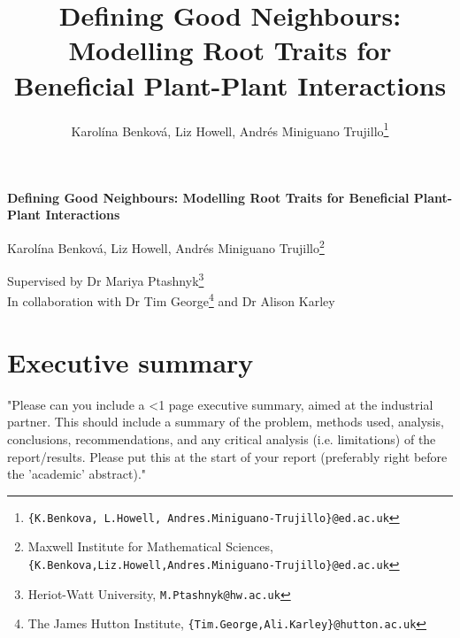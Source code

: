 \documentclass[11pt]{article}
\title{\bf
    \Large
    Defining Good Neighbours: Modelling Root Traits for Beneficial Plant-Plant Interactions
}
\author{
    Karolína Benková, Liz Howell, Andrés Miniguano Trujillo\footnote{ \texttt{\{K.Benkova, L.Howell, Andres.Miniguano-Trujillo\}@ed.ac.uk} }
}
\date{}
\begin{document}
\begin{titlepage}
    \begin{center}
        \vspace*{2cm}
        
        \Huge
        \textbf{Defining Good Neighbours: Modelling Root Traits for Beneficial Plant-Plant Interactions}
        
            
        \vspace{1cm}
        
        \Large Karolína Benková, Liz Howell, Andrés Miniguano Trujillo\footnote{\normalsize Maxwell Institute for Mathematical Sciences,   \texttt{\{K.Benkova,Liz.Howell,Andres.Miniguano-Trujillo\}@ed.ac.uk}}
        
            
        \vspace{1.5cm}
            
        \Large
        Supervised by Dr Mariya Ptashnyk\footnote{\normalsize Heriot-Watt University, \texttt{M.Ptashnyk@hw.ac.uk}} \\ 
        In collaboration with Dr Tim George\footnote{\normalsize The James Hutton Institute, \texttt{\{Tim.George,Ali.Karley\}@hutton.ac.uk}} and Dr Alison Karley\textsuperscript{\small\ddag}

        \vfill
            
        
    \end{center}
\end{titlepage}
\newpage
{}

\section*{Executive summary}
"Please can you include a <1 page executive
summary, aimed at the industrial partner.  This should include a summary
of the problem, methods used, analysis, conclusions, recommendations,
and any critical analysis (i.e. limitations) of the report/results.
Please put this at the start of your report (preferably right before the
'academic' abstract)."


\end{document}
